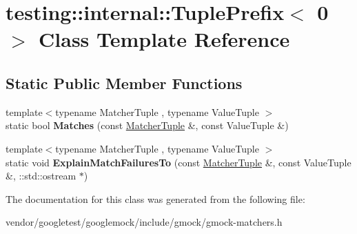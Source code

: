 \hypertarget{classtesting_1_1internal_1_1_tuple_prefix_3_010_01_4}{}\section{testing\+:\+:internal\+:\+:Tuple\+Prefix$<$ 0 $>$ Class Template Reference}
\label{classtesting_1_1internal_1_1_tuple_prefix_3_010_01_4}
\subsection*{Static Public Member Functions}
\begin{DoxyCompactItemize}
\item 
\mbox{\label{classtesting_1_1internal_1_1_tuple_prefix_3_010_01_4_a8bb323da9f209f4fef5d81d7c0b628e9}} 
{\footnotesize template$<$typename Matcher\+Tuple , typename Value\+Tuple $>$ }\\static bool {\bfseries Matches} (const \mbox{\hyperlink{structtesting_1_1internal_1_1_matcher_tuple}{Matcher\+Tuple}} \&, const Value\+Tuple \&)
\item 
\mbox{\label{classtesting_1_1internal_1_1_tuple_prefix_3_010_01_4_aa2980f100d8100e56a0dff1d6df9da57}} 
{\footnotesize template$<$typename Matcher\+Tuple , typename Value\+Tuple $>$ }\\static void {\bfseries Explain\+Match\+Failures\+To} (const \mbox{\hyperlink{structtesting_1_1internal_1_1_matcher_tuple}{Matcher\+Tuple}} \&, const Value\+Tuple \&, \+::std\+::ostream $\ast$)
\end{DoxyCompactItemize}


The documentation for this class was generated from the following file\+:\begin{DoxyCompactItemize}
\item 
vendor/googletest/googlemock/include/gmock/gmock-\/matchers.\+h\end{DoxyCompactItemize}
